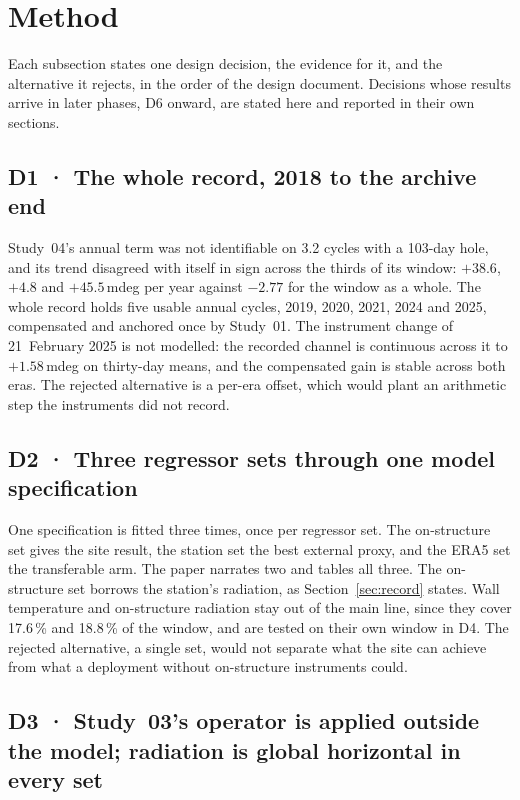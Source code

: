 \documentclass[11pt,a4paper]{article}
\begin{document}
\section{Method}
\label{sec:method}

Each subsection states one design decision, the evidence for it, and the
alternative it rejects, in the order of the design document. Decisions whose
results arrive in later phases, D6 onward, are stated here and reported in
their own sections.

\subsection{D1 · The whole record, 2018 to the archive end}

Study~04's annual term was not identifiable on 3.2 cycles with a 103-day hole,
and its trend disagreed with itself in sign across the thirds of its window:
$+38.6$, $+4.8$ and $+45.5$\,mdeg per year against $-2.77$ for the window as a
whole. The whole record holds five usable annual cycles, 2019, 2020, 2021, 2024
and 2025, compensated and anchored once by Study~01. The instrument change of
21~February 2025 is not modelled: the recorded channel is continuous across it
to $+1.58$\,mdeg on thirty-day means, and the compensated gain is stable across
both eras. The rejected alternative is a per-era offset, which would plant an
arithmetic step the instruments did not record.

\subsection{D2 · Three regressor sets through one model specification}

One specification is fitted three times, once per regressor set. The
on-structure set gives the site result, the station set the best external
proxy, and the ERA5 set the transferable arm. The paper narrates two and
tables all three. The on-structure set borrows the station's radiation, as
Section~\ref{sec:record} states. Wall temperature and on-structure radiation
stay out of the main line, since they cover 17.6\,\% and 18.8\,\% of the
window, and are tested on their own window in D4. The rejected alternative, a
single set, would not separate what the site can achieve from what a
deployment without on-structure instruments could.

\subsection{D3 · Study~03's operator is applied outside the model; radiation is global horizontal in every set}
\end{document}
